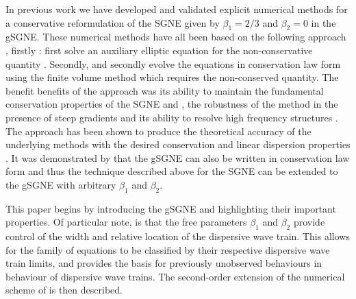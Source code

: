 \documentclass[10pt]{elsarticle}
\providecommand{\DIFaddtex}[1]{{\protect\color{blue} \sf #1}} %
\providecommand{\DIFdeltex}[1]{{\protect\color{red} \scriptsize #1}} %
\providecommand{\DIFaddbegin}{} %
\providecommand{\DIFaddend}{} %
\providecommand{\DIFdelbegin}{} %
\providecommand{\DIFdelend}{} %
\providecommand{\DIFadd}[1]{\texorpdfstring{\DIFaddtex{#1}}{#1}} %
\providecommand{\DIFdel}[1]{\texorpdfstring{\DIFdeltex{#1}}{}} %
\newcommand{\DIFscaledelfig}{0.5}
\newlength{\DIFdelgraphicswidth} %
\newlength{\DIFdelgraphicsheight} %
\newcommand{\DIFaddincludegraphics}[2][]{{\color{blue}\fbox{\DIFOincludegraphics[#1]{#2}}}} %
\newcommand{\DIFdelincludegraphics}[2][]{%
\sbox{\DIFdelgraphicsbox}{\DIFOincludegraphics[#1]{#2}}%
\settoboxwidth{\DIFdelgraphicswidth}{\DIFdelgraphicsbox} %
\settoboxtotalheight{\DIFdelgraphicsheight}{\DIFdelgraphicsbox} %
\scalebox{\DIFscaledelfig}{%
\parbox[b]{\DIFdelgraphicswidth}{\usebox{\DIFdelgraphicsbox}\\[-\baselineskip] \rule{\DIFdelgraphicswidth}{0em}}\llap{\resizebox{\DIFdelgraphicswidth}{\DIFdelgraphicsheight}{%
\setlength{\unitlength}{\DIFdelgraphicswidth}%
\begin{picture}(1,1)%
\thicklines\linethickness{2pt} %
{\color[rgb]{1,0,0}\put(0,0){\framebox(1,1){}}}%
{\color[rgb]{1,0,0}\put(0,0){\line( 1,1){1}}}%
{\color[rgb]{1,0,0}\put(0,1){\line(1,-1){1}}}%
\end{picture}%
}\hspace*{3pt}}} %
} %
\DeclareRobustCommand{\DIFaddbegin}{\DIFOaddbegin \let\includegraphics\DIFaddincludegraphics} %
\DeclareRobustCommand{\DIFaddend}{\DIFOaddend \let\includegraphics\DIFOincludegraphics} %
\DeclareRobustCommand{\DIFdelbegin}{\DIFOdelbegin \let\includegraphics\DIFdelincludegraphics} %
\DeclareRobustCommand{\DIFdelend}{\DIFOaddend \let\includegraphics\DIFOincludegraphics} %
\begin{document}
In previous work we have developed and validated \DIFaddbegin \DIFadd{explicit }\DIFaddend numerical methods for a conservative reformulation of the SGNE \cite{Zoppou-2014,Zoppou-etal-2016,Zoppou-etal-2017,Pitt-2019} given by $\beta_1 = 2/3$ and $\beta_2 =0$ in the gSGNE. These numerical methods have all been based on the following approach\DIFdelbegin \DIFdel{, firstly }\DIFdelend \DIFaddbegin \DIFadd{: first }\DIFaddend solve an auxiliary elliptic equation for the non-conservative quantity \DIFdelbegin \DIFdel{. Secondly, }\DIFdelend \DIFaddbegin \DIFadd{and secondly }\DIFaddend evolve the equations in conservation law form using the finite volume method which requires the non-conserved quantity. The \DIFdelbegin \DIFdel{benefit }\DIFdelend \DIFaddbegin \DIFadd{benefits }\DIFaddend of the approach was its ability to maintain the fundamental conservation properties of the SGNE \cite{Pitt-2019}\DIFdelbegin \DIFdel{and }\DIFdelend \DIFaddbegin \DIFadd{, }\DIFaddend the robustness of the method in the presence of steep gradients \DIFaddbegin \DIFadd{and its ability to resolve high frequency structures }\DIFaddend \cite{Pitt-2018-61}. The approach has been shown to produce the theoretical accuracy of the underlying methods \cite{Zoppou-etal-2017,Pitt-2019} with the desired conservation and linear dispersion properties \cite{Pitt-2019}. It was demonstrated by \citet{Clamond-Dutykh-2018-237} that the gSGNE can also be written in conservation law form and thus the technique described above for the SGNE can be extended to the gSGNE with arbitrary $\beta_1$ and $\beta_2$. 

This paper begins by introducing the gSGNE and highlighting their important properties. Of particular note, \DIFdelbegin \DIFdel{is that }\DIFdelend the free parameters $\beta_1$ and $\beta_2$ provide control of the width and relative location of the dispersive wave train. This allows for the family of equations to be classified by their respective dispersive wave train limits, and provides the basis for previously unobserved \DIFdelbegin \DIFdel{behaviours in }\DIFdelend \DIFaddbegin \DIFadd{behaviour of }\DIFaddend dispersive wave trains. The second-order extension of the numerical scheme of \citet{Zoppou-etal-2017} is then described. \DIFdelbegin %
\end{document}
